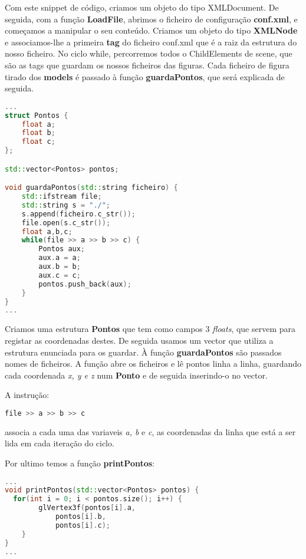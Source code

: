 \documentclass{article}
\begin{document}
Com este snippet de código, criamos um objeto do tipo XMLDocument. De seguida, com a função \textbf{LoadFile}, abrimos o ficheiro de configuração \textbf{conf.xml}, e começamos a manipular o seu conteúdo.
Criamos um objeto do tipo \textbf{XMLNode} e associamos-lhe a primeira \textbf{tag} do ficheiro conf.xml que é a raiz da estrutura do nosso ficheiro.
No ciclo while, percorremos todos o ChildElements de scene, que são as tags que guardam os nossos ficheiros das figuras.
Cada ficheiro de figura tirado dos \textbf{models} é passado à função \textbf{guardaPontos}, que será explicada de seguida.

\begin{file}
	\begin{lstlisting}[language=C++]
...
struct Pontos {
    float a;
    float b;
    float c;
};

std::vector<Pontos> pontos;

void guardaPontos(std::string ficheiro) {
	std::ifstream file;
	std::string s = "./";
	s.append(ficheiro.c_str());
	file.open(s.c_str());
	float a,b,c;
	while(file >> a >> b >> c) {
		Pontos aux;
		aux.a = a;
		aux.b = b;
		aux.c = c;
		pontos.push_back(aux);
	}
}
...
	\end{lstlisting}
\end{file}

Criamos uma estrutura \textbf{Pontos} que tem como campos 3 \textit{floats}, que servem para registar as coordenadas destes. De seguida usamos um vector que utiliza a estrutura enunciada para os guardar.
À função \textbf{guardaPontos} são passados nomes de ficheiros. A função abre os ficheiros e lê pontos linha a linha, guardando cada coordenada \textit{x, y e z} num \textbf{Ponto} e de seguida inserindo-o no vector.

\begin{info} 
	A instrução:
	\begin{lstlisting}[language=C++]
		file >> a >> b >> c
	\end{lstlisting}
	associa a cada uma das variaveis \textit{a, b} e \textit{c}, as coordenadas da linha que está a ser lida em cada iteração do ciclo.
\end{info}

Por ultimo temos a função \textbf{printPontos}:

\begin{file}
	\begin{lstlisting}[language=C++]
...
void printPontos(std::vector<Pontos> pontos) {
  for(int i = 0; i < pontos.size(); i++) {
		glVertex3f(pontos[i].a,
			pontos[i].b, 
			pontos[i].c);
	}
}
...
	\end{lstlisting}
\end{file}
\end{document}
